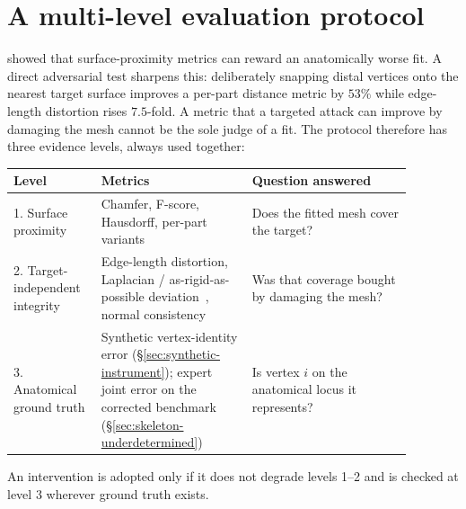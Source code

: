 \section{A multi-level evaluation protocol}
\label{sec:eval-suite}

 showed that surface-proximity metrics can reward an anatomically worse
fit. A direct adversarial test sharpens this: deliberately snapping distal
vertices onto the nearest target surface improves a per-part distance metric
by $53\%$ while edge-length distortion rises $7.5$-fold. A metric that a
targeted attack can improve by damaging the mesh cannot be the sole judge of
a fit. The protocol therefore has three evidence levels, always used
together:

\begin{center}
\begin{tabular}{@{}p{0.18\linewidth}p{0.34\linewidth}p{0.36\linewidth}@{}}
\toprule
\textbf{Level} & \textbf{Metrics} & \textbf{Question answered} \\
\midrule
1. Surface proximity & Chamfer, F-score, Hausdorff, per-part variants &
  Does the fitted mesh cover the target? \\
2. Target-independent integrity & Edge-length distortion, Laplacian /
  as-rigid-as-possible deviation~\cite{arap}, normal consistency &
  Was that coverage bought by damaging the mesh? \\
3. Anatomical ground truth & Synthetic vertex-identity error
  (\S\ref{sec:synthetic-instrument}); expert joint error on the corrected
  benchmark (\S\ref{sec:skeleton-underdetermined}) &
  Is vertex $i$ on the anatomical locus it represents? \\
\bottomrule
\end{tabular}
\end{center}

An intervention is adopted only if it does not degrade levels 1--2 and is
checked at level 3 wherever ground truth exists.

